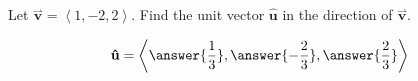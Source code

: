 \documentclass{ximera}
\author{Gregory Hartman \and Matthew Carr}
\begin{document}
\begin{exercise}
Let $\overset{\boldsymbol{\rightharpoonup}}{\mathbf{v}}  = \left\langle 1,-2,2 \right\rangle$. Find the unit vector $\mathbf{\hat{u}}$ in the
direction of $\overset{\boldsymbol{\rightharpoonup}}{\mathbf{v}}$.

\begin{prompt}
\[
\mathbf{\hat{u}} = \left\langle \answer{\frac{1}{3}},\answer{-\frac{2}{3}},\answer{\frac{2}{3}} \right\rangle
\]
\end{prompt}

\end{exercise}
\end{document}
